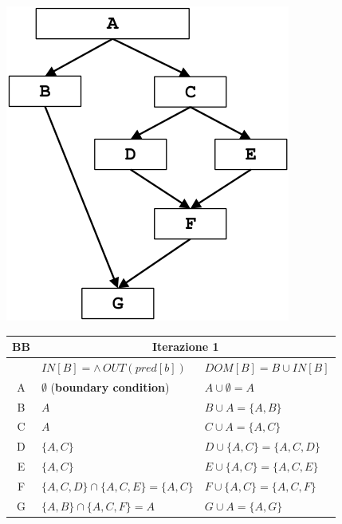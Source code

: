 \documentclass[10pt,a4paper]{article}
\begin{document}
\noindent\begin{minipage}[c]{.4\textwidth}
  \includegraphics[width=.7\textwidth]{example-2.png}
\end{minipage}
\begin{minipage}[c]{.5\textwidth}
\centering
\renewcommand{\arraystretch}{1.5}
\begin{tabular}{|c|l|l|}
\hline
\rowcolor{blue!30}
BB & \multicolumn{2}{c|}{Iterazione 1} \\
\hline
\rowcolor{blue!30}
   & $IN[B] = \wedge\, OUT(pred[b])$ & $DOM[B]= B \cup IN[B]$ \\
\hline
A & $\emptyset$ (\textbf{boundary condition}) & $A \cup \emptyset = A$ \\
\hline
B & $A$ & $B \cup A=\lbrace A,B \rbrace$ \\
\hline
C & $A$ & $C \cup A = \lbrace A,C \rbrace$ \\
\hline
D & $\lbrace A,C \rbrace$ & $D \cup \lbrace A,C \rbrace = \lbrace A,C,D \rbrace$ \\
\hline
E & $\lbrace A,C \rbrace$ & $E \cup \lbrace A,C \rbrace = \lbrace A,C,E \rbrace$ \\
\hline
F & $\lbrace A,C,D\rbrace\cap \lbrace A,C,E\rbrace = \lbrace A,C \rbrace$ & $F \cup \lbrace A,C\rbrace = \lbrace A,C,F\rbrace$ \\
\hline
G & $\lbrace A,B \rbrace \cap \lbrace A,C,F\rbrace = A$ & $G \cup A = \lbrace A,G \rbrace$ \\
\hline
\end{tabular}
\end{minipage}
\end{document}
